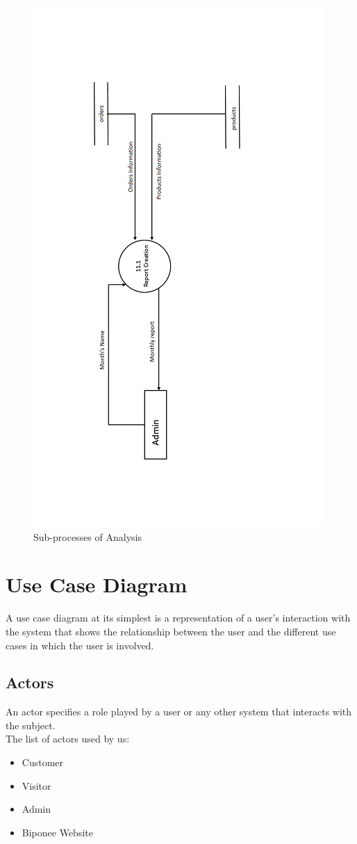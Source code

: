 \begin{figure}
 \centering
\includegraphics{figures/11final.png}
\caption{Sub-processes of Analysis}
\end{figure}

\newpage
\section{ Use Case Diagram}
 A use case diagram at its simplest is a representation of a user's interaction with the system that shows the relationship between the user and the different use cases in which the user is involved.
 
 \subsection{Actors}
  An actor specifies a role played by a user or any other system that interacts with the subject.\\ 
  The list of actors used by us:
\begin{itemize}
  \item Customer
  \item Visitor
    \item Admin
  \item Biponee Website
\end{itemize}


